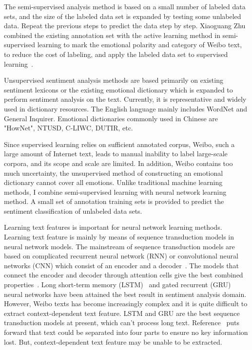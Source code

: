 \documentclass{ieeeaccess}
\begin{document}
The semi-supervised analysis method is based on a small number of labeled data sets, and the size of the labeled data set is expanded by testing some unlabeled data. Repeat the previous steps to predict the data step by step. Xiaoguang Zhu combined the existing annotation set with the active learning method in semi-supervised learning to mark the emotional polarity and category of Weibo text, to reduce the cost of labeling, and apply the labeled data set to supervised learning~\cite{zhu2013chinese}.

Unsupervised sentiment analysis methods are based primarily on existing sentiment lexicons or the existing emotional dictionary which is expanded to perform sentiment analysis on the text. Currently, it is representative and widely used in dictionary resources. The English language mainly includes WordNet and General Inquirer. Emotional dictionaries commonly used in Chinese are "HowNet", NTUSD, C-LIWC, DUTIR, etc.

Since supervised learning relies on sufficient annotated corpus, Weibo, such a large amount of Internet text, leads to manual inability to label large-scale corpora, and its scope and scale are limited. In addition, Weibo contains too much uncertainty, the unsupervised method of constructing an emotional dictionary cannot cover all emotions.  Unlike traditional machine learning methods, I combine semi-supervised learning with neural network learning method. A small set of annotation training sets is provided to predict the sentiment classification of unlabeled data sets.

Learning text features is important for neural network learning methods. Learning text feature is mainly by means of sequence transduction models in neural network models. The mainstream of sequence transduction models are based on complicated recurrent neural network (RNN) or convolutional neural networks (CNN) which consist of an encoder and a decoder~\cite{pang2019deadlock}. The models that connect the encoder and decoder through attention cells give the best combined properties~\cite{DBLP:conf/nips/VaswaniSPUJGKP17}. Long short-term memory (LSTM)~\cite{DBLP:journals/neco/HochreiterS97} and gated recurrent (GRU)~\cite{DBLP:journals/corr/ChungGCB14} neural networks have been attained the best result in sentiment analysis domain. However, Weibo texts has become increasingly complex and it is quite difficult to extract context-dependent text feature. LSTM and GRU are the best sequence transduction models at present, which can’t process long text. Reference~\cite{DBLP:conf/naacl/SongSLZ18} puts forward that text could be separated into four parts to ensure no key information lost. But, context-dependent text feature may be unable to be extracted.
\end{document}
